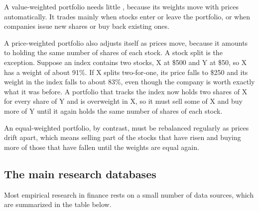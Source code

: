 A value-weighted portfolio needs little , because its weights move with prices automatically. It trades mainly when stocks enter or leave the portfolio, or when companies issue new shares or buy back existing ones. 

A price-weighted portfolio also adjusts itself as prices move, because it amounts to holding the same number of shares of each stock. A stock split is the exception. Suppose an index contains two stocks, X at \$500 and Y at \$50, so X has a weight of about 91\%. 
If X splits two-for-one, its price falls to \$250 and its weight in the index falls to about 83\%, 
even though the company is worth exactly what it was before. A portfolio that tracks the index now holds two shares of X for every share of Y and is overweight in X, so it must sell some of X and buy more of Y until it again holds the same number of shares of each stock.


An equal-weighted portfolio, by contrast, must be rebalanced regularly as prices drift apart, which means selling part of the stocks that have risen and buying more of those that have fallen until the weights are equal again.


\subsection{The main research databases}

Most empirical research in finance rests on a small number of data sources, which are summarized in the table below.

